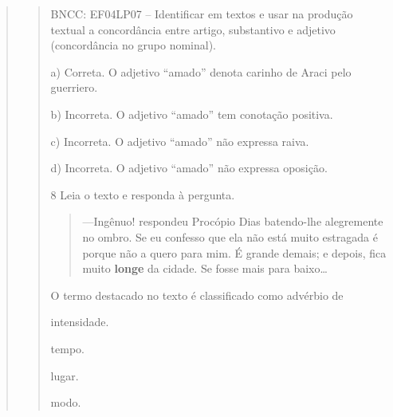 \begin{escolha}
\begin{escolha}
\begin{escolha}
\begin{quote}
\begin{quote}
{{BNCC: EF04LP07 -- Identificar em textos e usar na produção textual a
concordância entre artigo, substantivo e adjetivo (concordância no grupo
nominal).

a) Correta. O adjetivo ``amado'' denota carinho de Araci pelo guerriero.

b) Incorreta. O adjetivo ``amado'' tem conotação positiva.

c) Incorreta. O adjetivo ``amado'' não expressa raiva.

d) Incorreta. O adjetivo ``amado'' não expressa oposição.}

\num{8} Leia o texto e responda à pergunta.

\begin{quote}
---Ingênuo! respondeu Procópio Dias batendo-lhe alegremente no ombro.
Se eu confesso que ela não está muito estragada é porque não a quero
para mim. É grande demais; e depois, fica muito \textbf{longe} da cidade.
Se fosse mais para baixo\ldots
\end{quote}


O termo destacado no texto é classificado como advérbio de

\begin{escolha}
  \item intensidade.

  \item tempo.

  \item lugar.

  \item modo.
\end{escolha}


}
\end{quote}
\end{quote}
\end{escolha}
\end{escolha}
\end{escolha}
